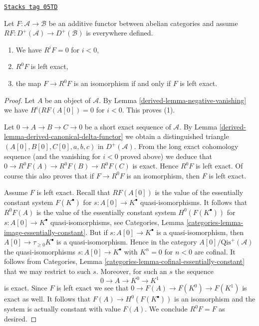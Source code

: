 \begin{lemma}
\label{derived-lemma-left-exact-higher-derived}
\href{https://stacks.math.columbia.edu/tag/05TD}{\texttt{Stacks tag 05TD}}

Let $F : \mathcal{A} \to \mathcal{B}$ be an additive functor
between abelian categories and assume
$RF : D^{+}(\mathcal{A}) \to D^{+}(\mathcal{B})$ is everywhere
defined.
\begin{enumerate}
\item We have $R^iF = 0$ for $i < 0$,
\item $R^0F$ is left exact,
\item the map $F \to R^0F$ is an isomorphism if and
only if $F$ is left exact.
\end{enumerate}
\end{lemma}

\begin{proof}

Let $A$ be an object of $\mathcal{A}$. By Lemma \ref{derived-lemma-negative-vanishing}
we have $H^i(RF(A[0]) = 0$ for $i < 0$. This proves (1).

\medskip\noindent
Let $0 \to A \to B \to C \to 0$ be a short exact sequence of $\mathcal{A}$.
By
Lemma \ref{derived-lemma-derived-canonical-delta-functor}
we obtain a distinguished triangle
$(A[0], B[0], C[0], a, b, c)$ in $D^{+}(\mathcal{A})$.
From the long exact cohomology sequence (and the vanishing for $i < 0$
proved above) we deduce that $0 \to R^0F(A) \to R^0F(B) \to R^0F(C)$
is exact. Hence $R^0F$ is left exact. Of course this also proves that if
$F \to R^0F$ is an isomorphism, then $F$ is left exact.

\medskip\noindent
Assume $F$ is left exact. Recall that $RF(A[0])$ is the value of the
essentially constant system $F(K^\bullet)$ for $s : A[0] \to K^\bullet$
quasi-isomorphisms. It follows that $R^0F(A)$ is the value of the essentially
constant system $H^0(F(K^\bullet))$ for $s : A[0] \to K^\bullet$
quasi-isomorphisms, see Categories, Lemma
\ref{categories-lemma-image-essentially-constant}.
But if $s : A[0] \to K^\bullet$ is a quasi-isomorphism, then
$A[0] \to \tau_{\geq 0}K^\bullet$ is a quasi-isomorphism.
Hence in the category $A[0]/\text{Qis}^{+}(\mathcal{A})$ the
quasi-isomorphisms $s : A[0] \to K^\bullet$ with $K^n = 0$ for $n < 0$
are cofinal. It follows from
Categories, Lemma \ref{categories-lemma-cofinal-essentially-constant}
that we may restrict to such $s$.
Moreover, for such an $s$ the sequence
$$
0 \to A \to K^0 \to K^1
$$
is exact. Since $F$ is left exact we see that
$0 \to F(A) \to F(K^0) \to F(K^1)$ is exact as well.
It follows that $F(A) \to H^0(F(K^\bullet))$ is an isomorphism
and the system is actually constant with value $F(A)$.
We conclude $R^0F = F$ as desired.
\end{proof}

